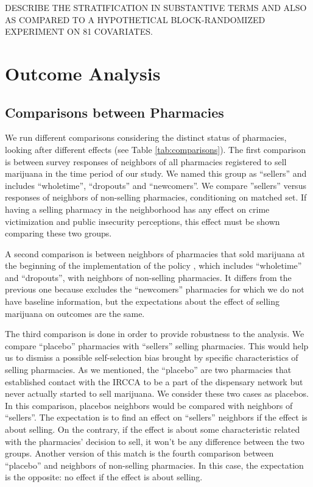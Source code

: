 \documentclass[11pt]{article}
\begin{document}
DESCRIBE THE STRATIFICATION IN SUBSTANTIVE TERMS AND ALSO AS COMPARED TO A HYPOTHETICAL BLOCK-RANDOMIZED EXPERIMENT ON 81 COVARIATES.

\section{Outcome Analysis}
\subsection{Comparisons between Pharmacies}
We run different comparisons considering the distinct status of pharmacies, looking after different effects (see Table \ref{tab:comparisons}). The first comparison is between survey responses of neighbors of all pharmacies registered to sell marijuana in the time period of our study. We named this group as ``sellers'' and includes ``wholetime'', ``dropouts'' and ``newcomers''. We compare ''sellers'' versus responses of neighbors of non-selling pharmacies, conditioning on matched set. If having a selling pharmacy in the neighborhood has any effect on crime victimization and public insecurity perceptions, this effect must be shown comparing these two groups.

A second comparison is between neighbors of pharmacies that sold marijuana at the beginning of the implementation of the policy , which includes ``wholetime'' and ``dropouts'', with neighbors of non-selling pharmacies. It differs from the previous one because excludes the ``newcomers'' pharmacies for which we do not have baseline information, but the expectations about the effect of selling marijuana on outcomes are the same.

The third comparison is done in order to provide robustness to the analysis. We compare ``placebo'' pharmacies with ``sellers'' selling pharmacies. This would help us to dismiss a possible self-selection bias brought by specific characteristics of selling pharmacies. As we mentioned, the ``placebo'' are two pharmacies that established contact with the IRCCA to be a part of the dispensary network but never actually started to sell marijuana. We consider these two cases as placebos. In this comparison, placebos neighbors would be compared with neighbors of ``sellers''. The expectation is to find an effect on ``sellers'' neighbors if the effect is about selling. On the contrary, if the effect is about some characteristic related with the pharmacies' decision to sell, it won't be any difference between the two groups. Another version of this match is the fourth comparison between ``placebo'' and neighbors of non-selling pharmacies. In this case, the expectation is the opposite: no effect if the effect is about selling.
\end{document}
